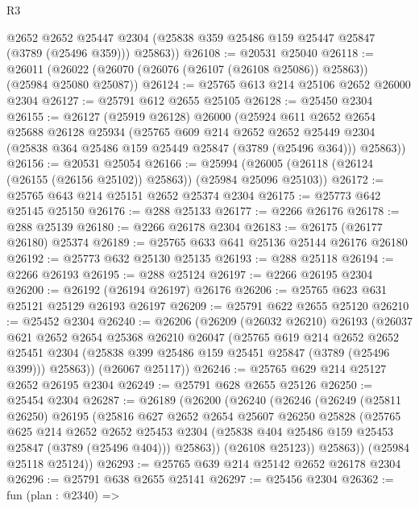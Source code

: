 \begin{lexlean}{R3}
\begin{coremodule}
        @2652
        @2652
        @25447
        @2304
        (@25838 @359 @25486 @159 @25447 @25847 (@3789 (@25496 @359)))
        @25863))
@26108 := @20531 @25040
@26118 := @26011 (@26022 (@26070 (@26076 (@26107 (@26108 @25086)) @25863)) (@25984 @25080 @25087))
@26124 := @25765 @613 @214 @25106 @2652 @26000 @2304
@26127 := @25791 @612 @2655 @25105
@26128 := @25450 @2304
@26155 := @26127
    (@25919 @26128)
    @26000
    (@25924
      @611
      @2652
      @2654
      @25688
      @26128
      @25934
      (@25765
        @609
        @214
        @2652
        @2652
        @25449
        @2304
        (@25838 @364 @25486 @159 @25449 @25847 (@3789 (@25496 @364)))
        @25863))
@26156 := @20531 @25054
@26166 := @25994 (@26005 (@26118 (@26124 (@26155 (@26156 @25102)) @25863)) (@25984 @25096 @25103))
@26172 := @25765 @643 @214 @25151 @2652 @25374 @2304
@26175 := @25773 @642 @25145 @25150
@26176 := @288 @25133
@26177 := @2266 @26176
@26178 := @288 @25139
@26180 := @2266 @26178 @2304
@26183 := @26175 (@26177 @26180) @25374
@26189 := @25765 @633 @641 @25136 @25144 @26176 @26180
@26192 := @25773 @632 @25130 @25135
@26193 := @288 @25118
@26194 := @2266 @26193
@26195 := @288 @25124
@26197 := @2266 @26195 @2304
@26200 := @26192 (@26194 @26197) @26176
@26206 := @25765 @623 @631 @25121 @25129 @26193 @26197
@26209 := @25791 @622 @2655 @25120
@26210 := @25452 @2304
@26240 := @26206
    (@26209
      (@26032 @26210)
      @26193
      (@26037
        @621
        @2652
        @2654
        @25368
        @26210
        @26047
        (@25765
          @619
          @214
          @2652
          @2652
          @25451
          @2304
          (@25838 @399 @25486 @159 @25451 @25847 (@3789 (@25496 @399)))
          @25863))
      (@26067 @25117))
@26246 := @25765 @629 @214 @25127 @2652 @26195 @2304
@26249 := @25791 @628 @2655 @25126
@26250 := @25454 @2304
@26287 := @26189
    (@26200
      (@26240
        (@26246
          (@26249
            (@25811 @26250)
            @26195
            (@25816
              @627
              @2652
              @2654
              @25607
              @26250
              @25828
              (@25765
                @625
                @214
                @2652
                @2652
                @25453
                @2304
                (@25838 @404 @25486 @159 @25453 @25847 (@3789 (@25496 @404)))
                @25863))
            (@26108 @25123))
          @25863))
      (@25984 @25118 @25124))
@26293 := @25765 @639 @214 @25142 @2652 @26178 @2304
@26296 := @25791 @638 @2655 @25141
@26297 := @25456 @2304
@26362 := fun (plan : @2340) =>

\end{coremodule}
\end{lexlean}
